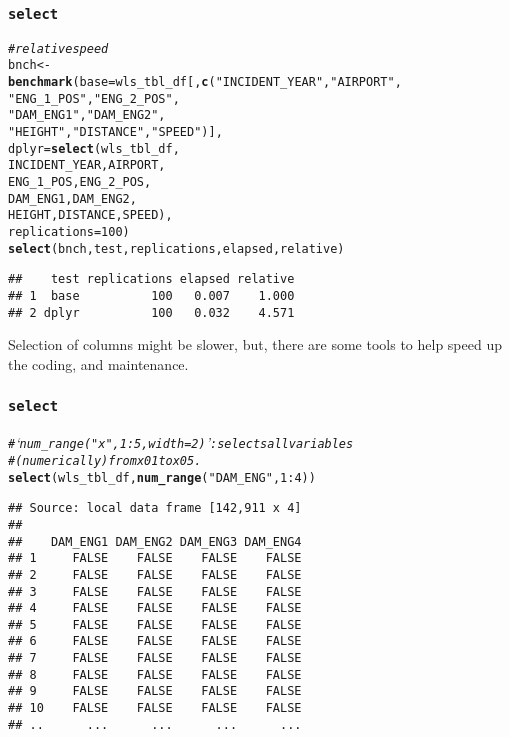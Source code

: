 \documentclass{beamer}\usepackage[]{graphicx}\usepackage[]{color}
\makeatletter
\newcommand{\hlnum}[1]{\textcolor[rgb]{0.686,0.059,0.569}{#1}}%
\newcommand{\hlstr}[1]{\textcolor[rgb]{0.192,0.494,0.8}{#1}}%
\newcommand{\hlcom}[1]{\textcolor[rgb]{0.678,0.584,0.686}{\textit{#1}}}%
\newcommand{\hlopt}[1]{\textcolor[rgb]{0,0,0}{#1}}%
\newcommand{\hlstd}[1]{\textcolor[rgb]{0.345,0.345,0.345}{#1}}%
\newcommand{\hlkwb}[1]{\textcolor[rgb]{0.69,0.353,0.396}{#1}}%
\newcommand{\hlkwc}[1]{\textcolor[rgb]{0.333,0.667,0.333}{#1}}%
\newcommand{\hlkwd}[1]{\textcolor[rgb]{0.737,0.353,0.396}{\textbf{#1}}}%
\newenvironment{kframe}{%
 \def\at@end@of@kframe{}%
 \ifinner\ifhmode%
  \def\at@end@of@kframe{\end{minipage}}%
  \begin{minipage}{\columnwidth}%
 \fi\fi%
 \def\FrameCommand##1{\hskip\@totalleftmargin \hskip-\fboxsep
 \colorbox{shadecolor}{##1}\hskip-\fboxsep
     \hskip-\linewidth \hskip-\@totalleftmargin \hskip\columnwidth}%
 \MakeFramed {\advance\hsize-\width
   \@totalleftmargin\z@ \linewidth\hsize
   \@setminipage}}%
 {\par\unskip\endMakeFramed%
 \at@end@of@kframe}
\newenvironment{knitrout}{}{} %
\makeatother
\begin{document}
\begin{frame}[fragile]
  \frametitle{{\tt select}}
\begin{knitrout}\footnotesize
{}\color{fgcolor}\begin{kframe}
\begin{alltt}
\hlcom{# relative speed }
\hlstd{bnch} \hlkwb{<-}
  \hlkwd{benchmark}\hlstd{(}\hlkwc{base}  \hlstd{= wls_tbl_df[,} \hlkwd{c}\hlstd{(}\hlstr{"INCIDENT_YEAR"}\hlstd{,} \hlstr{"AIRPORT"}\hlstd{,}
                                   \hlstr{"ENG_1_POS"}\hlstd{,} \hlstr{"ENG_2_POS"}\hlstd{,}
                                   \hlstr{"DAM_ENG1"}\hlstd{,} \hlstr{"DAM_ENG2"}\hlstd{,}
                                   \hlstr{"HEIGHT"}\hlstd{,} \hlstr{"DISTANCE"}\hlstd{,} \hlstr{"SPEED"}\hlstd{)],}
            \hlkwc{dplyr} \hlstd{=} \hlkwd{select}\hlstd{(wls_tbl_df,}
                           \hlstd{INCIDENT_YEAR, AIRPORT,}
                           \hlstd{ENG_1_POS, ENG_2_POS,}
                           \hlstd{DAM_ENG1, DAM_ENG2,}
                           \hlstd{HEIGHT, DISTANCE, SPEED),}
            \hlkwc{replications} \hlstd{=} \hlnum{100}\hlstd{)}
\hlkwd{select}\hlstd{(bnch, test, replications, elapsed, relative)}
\end{alltt}
\begin{verbatim}
##    test replications elapsed relative
## 1  base          100   0.007    1.000
## 2 dplyr          100   0.032    4.571
\end{verbatim}
\end{kframe}
\end{knitrout}

Selection of columns might be slower, but, there are some
tools to help speed up the coding, and maintenance.
\end{frame} 


\begin{frame}[fragile]
  \frametitle{{\tt select}}
\begin{knitrout}\footnotesize
{}\color{fgcolor}\begin{kframe}
\begin{alltt}
\hlcom{# ‘num_range("x", 1:5, width = 2)’: selects all variables}
\hlcom{# (numerically) from x01 to x05.}
\hlkwd{select}\hlstd{(wls_tbl_df,} \hlkwd{num_range}\hlstd{(}\hlstr{"DAM_ENG"}\hlstd{,} \hlnum{1}\hlopt{:}\hlnum{4}\hlstd{))}
\end{alltt}
\begin{verbatim}
## Source: local data frame [142,911 x 4]
## 
##    DAM_ENG1 DAM_ENG2 DAM_ENG3 DAM_ENG4
## 1     FALSE    FALSE    FALSE    FALSE
## 2     FALSE    FALSE    FALSE    FALSE
## 3     FALSE    FALSE    FALSE    FALSE
## 4     FALSE    FALSE    FALSE    FALSE
## 5     FALSE    FALSE    FALSE    FALSE
## 6     FALSE    FALSE    FALSE    FALSE
## 7     FALSE    FALSE    FALSE    FALSE
## 8     FALSE    FALSE    FALSE    FALSE
## 9     FALSE    FALSE    FALSE    FALSE
## 10    FALSE    FALSE    FALSE    FALSE
## ..      ...      ...      ...      ...
\end{verbatim}
\end{kframe}
\end{knitrout}
\end{frame} 
\end{document}
